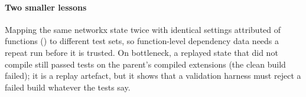 \paragraph*{Two smaller lessons}
Mapping the same networkx state twice with identical settings attributed \CSevenFuncs{} of \CSevenTotal{} functions (\CSevenPct\pct) to different test sets, so function-level dependency data needs a repeat run before it is trusted.
On bottleneck, a replayed state that did not compile still passed \HOnePassed{} tests on the parent's compiled extensions (the clean build failed); it is a replay artefact, but it shows that a validation harness must reject a failed build whatever the tests say.
